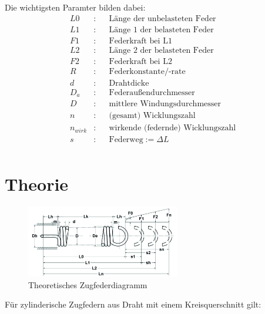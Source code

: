     Die wichtigsten Paramter bilden dabei:
    \begin{align*}
        L0 &:& &\text{Länge der unbelasteten Feder}\\
        L1 &:& &\text{Länge 1 der belasteten Feder}\\
        F1 &:& &\text{Federkraft bei L1}\\
        L2 &:& &\text{Länge 2 der belasteten Feder}\\
        F2 &:& &\text{Federkraft bei L2}\\
        R &:& &\text{Federkonstante/-rate}\\
        d &:& &\text{Drahtdicke}\\
        D_a &:& &\text{Federaußendurchmesser}\\
        D &:& &\text{mittlere Windungsdurchmesser}\\
        n &:& &\text{(gesamt) Wicklungszahl}\\
        n_{wirk}&:& &\text{wirkende (federnde) Wicklungszahl}\\
        s &:& &\text{Federweg}:=\Delta L \\
    \end{align*}
\label{sec:praxis}























\newpage
\section{Theorie}
\begin{figure}[H]
    \centering
    \includegraphics[width=0.6\textwidth]{bilder/Input/Zugfeder_technisch.jpg}
    \caption{Theoretisches Zugfederdiagramm \cite{AusM2}}
\end{figure}
Für zylinderische Zugfedern aus Draht mit einem Kreisquerschnitt gilt:\\\\

